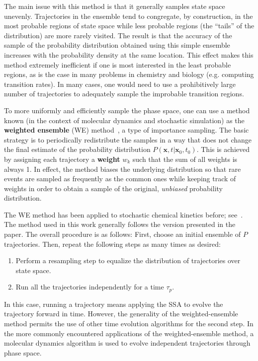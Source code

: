 \documentclass[english,letterpaper,12pt]{report}
\newcommand{\defkeywd}[1]{\textbf{#1}}
\renewcommand{\vec}[1]{\ensuremath{\mathbf{#1}}}
\begin{document}
\begin{doublespacing}
The main issue with this method is that it generally samples state space unevenly. Trajectories in the ensemble tend to congregate, by construction, in the most probable regions of state space while less probable regions (the ``tails'' of the distribution) are more rarely visited. The result is that the accuracy of the sample of the probability distribution obtained using this simple ensemble increases with the probability density at the same location. This effect makes this method extremely inefficient if one is most interested in the least probable regions, as is the case in many problems in chemistry and biology (e.g. computing transition rates).
In many cases,  one would need to use a prohibitively large number of trajectories to adequately sample the improbable transition regions.

To more uniformly and efficiently sample the phase space, one can use a method known (in the context of molecular dynamics and stochastic simulation) as the \defkeywd{weighted ensemble} (WE) method~\cite{we-orig}, a type of importance sampling. The basic strategy is to periodically redistribute the samples in a way that does not change the final estimate of the probability distribution $P(\vec{x}, t | \vec{x}_0, t_0)$. This is achieved by assigning each trajectory a \defkeywd{weight} $w_k$ such that the sum of all weights is always 1. In effect, the method biases the underlying distribution so that rare events are sampled as frequently as the common ones while keeping track of weights in order to obtain a sample of the original, \emph{unbiased} probability distribution.

The WE method has been applied to stochastic chemical kinetics before; see~\cite{we-chemkin}. The method used in this work generally follows the version presented in the paper. The overall procedure is as follows: First, choose an initial ensemble of $P$ trajectories. Then, repeat the following steps as many times as desired:
\begin{enumerate}
    \item Perform a resampling step to equalize the distribution of trajectories over state space.
    \item Run all the trajectories independently for a time $\tau_p$.
\end{enumerate}
In this case, running a trajectory means applying the SSA to evolve the trajectory forward in time. However, the generality of the weighted-ensemble method permits the use of other time evolution algorithms for the second step. In the more commonly encountered applications of the weighted-ensemble method, a molecular dynamics algorithm is used to evolve independent trajectories through phase space.


\end{doublespacing}
\end{document}
